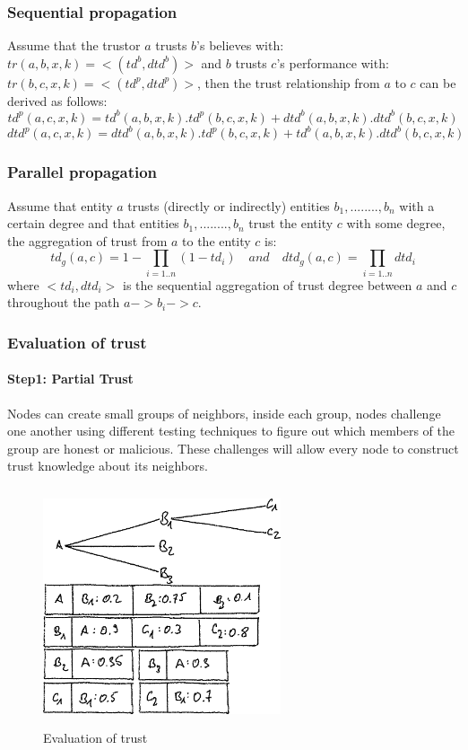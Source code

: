 \subsubsection*{Sequential propagation}
Assume that the trustor $a$ trusts $b$’s believes with: 
$tr(a,b,x,k)=<(td^b,dtd^b)>$ and $b$ trusts $c$’s performance with: 
$tr(b,c,x,k)=<(td^p,dtd^p)>$, then the trust relationship from $a$ to $c$ can be derived as follows:
$$td^p(a,c,x,k)=td^b(a,b,x,k).td^p(b,c,x,k)+ dtd^b(a,b,x,k).dtd^b(b,c,x,k)$$
$$dtd^p(a,c,x,k)=dtd^b(a,b,x,k).td^p(b,c,x,k) + td^b(a,b,x,k).dtd^b(b,c,x,k)$$

\subsubsection*{Parallel propagation}
Assume that entity $a$ trusts (directly or indirectly) entities $b_1,........,b_n$ with a certain degree and that entities $b_1,........,b_n$ trust the entity $c$ with some degree, the aggregation of trust from $a$ to the entity $c$ is:
$$td_g(a,c)=1-\prod_{i=1..n}(1-td_i) \quad and \quad dtd_g(a,c)=\prod_{i=1..n}dtd_i$$
where $<td_i,dtd_i>$ is the sequential aggregation of trust degree between $a$ and $c$ throughout the path $a->b_i->c$.

\subsubsection*{Evaluation of trust}
\paragraph{Step1: Partial Trust}
Nodes can create small groups of neighbors, inside each group, nodes challenge one another using different testing techniques to figure out which members of the group are honest or malicious. 
These challenges will allow every node to construct trust knowledge about its neighbors. 
\begin{figure}
    \centering
    \includegraphics[width=7cm,height=7cm,keepaspectratio]{../whitepaper/images/reputation.png}
    \caption{Evaluation of trust}
    \label{fig:Evaluation of trust}
\end{figure}

